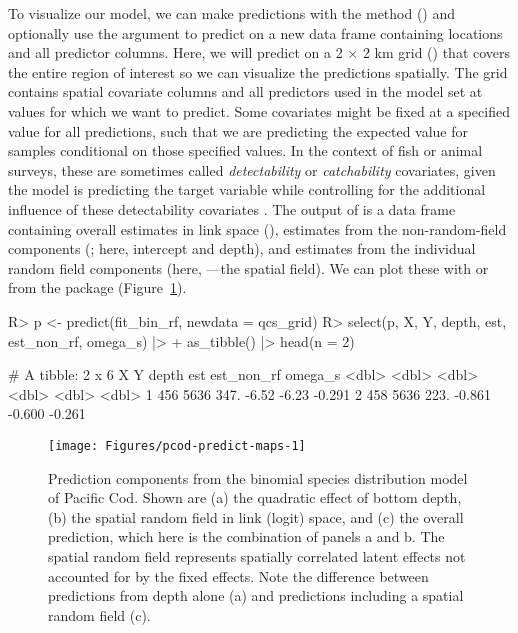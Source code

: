 \documentclass[article]{jss}\usepackage[]{graphicx}\usepackage[dvipsnames]{xcolor}
\newcommand{\fct}[1]{\code{#1()}}
\begin{document}
\sloppy To visualize our model, we can make predictions with the \fct{predict} method () and optionally use the  argument to predict on a new data frame containing locations and all predictor columns.
Here, we will predict on a 2 \(\times\) 2 km grid () that covers the entire region of interest so we can visualize the predictions spatially.
The grid contains spatial covariate columns and all predictors used in the model set at values for which we want to predict.
Some covariates might be fixed at a specified value for all predictions, such that we are predicting the expected value for samples conditional on those specified values.
In the context of fish or animal surveys, these are sometimes called \emph{detectability} or \emph{catchability} covariates, given the model is predicting the target variable while controlling for the additional influence of these detectability covariates \cite{thorson2019}.
The output of \fct{predict} is a data frame containing overall estimates in link space (), estimates from the non-random-field components (; here, intercept and depth), and estimates from the individual random field components (here, ---the spatial field).
We can plot these with \fct{geom\_raster} or \fct{geom\_tile}  from the  \citep{ggplot2} package (Figure~\ref{fig:pcod-predict-maps}).

\begin{Schunk}
\begin{Sinput}
R> p <- predict(fit_bin_rf, newdata = qcs_grid)
R> select(p, X, Y, depth, est, est_non_rf, omega_s) |>
+    as_tibble() |> head(n = 2)
\end{Sinput}
\begin{Soutput}
# A tibble: 2 x 6
      X     Y depth    est est_non_rf omega_s
  <dbl> <dbl> <dbl>  <dbl>      <dbl>   <dbl>
1   456  5636  347. -6.52      -6.23   -0.291
2   458  5636  223. -0.861     -0.600  -0.261
\end{Soutput}
\end{Schunk}

\begin{Schunk}
\begin{figure}[ht]

{\centering \texttt{[image: Figures/pcod-predict-maps-1]} 

}

\caption[Prediction components from the binomial species distribution model of Pacific Cod]{Prediction components from the binomial species distribution model of Pacific Cod. Shown are (a) the quadratic effect of bottom depth, (b) the spatial random field in link (logit) space, and (c) the overall prediction, which here is the combination of panels a and b. The spatial random field represents spatially correlated latent effects not accounted for by the fixed effects. Note the difference between predictions from depth alone (a) and predictions including a spatial random field (c).}\label{fig:pcod-predict-maps}
\end{figure}
\end{Schunk}
\end{document}
